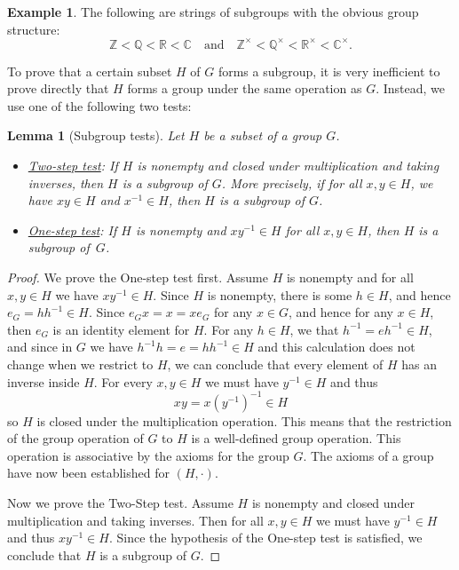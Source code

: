 \documentclass[12pt]{report}
\newtheorem{lemma}[theorem]{Lemma}
\numberwithin{equation}{section}
\numberwithin{theorem}{chapter}
\theoremstyle{definition}
\newtheorem{example}[theorem]{Example}
\newtheorem*{basic properties}{Basic Properties}
\newtheorem*{Important Remark}{Important Remark}
\newcommand{\C}{\mathbb{C}}
\begin{document}
\begin{example}
The following are strings of subgroups with the obvious group structure: 
$$\mathbb{Z} < \mathbb{Q} < \mathbb{R} < \C \quad \textrm{and} \quad \mathbb{Z}^\times < \mathbb{Q}^\times < \mathbb{R}^\times < \C^\times.$$
\end{example}


To prove that a certain subset $H$ of $G$ forms a subgroup, it is very inefficient to prove directly that $H$ forms a group under the same operation as $G$. Instead, we use one of the following two tests:

\begin{lemma}[Subgroup tests]
Let $H$ be a subset of a group $G$.
\begin{itemize}[leftmargin=10pt]
	\item \underline{Two-step test}:
If $H$ is nonempty and closed under multiplication and taking inverses, then $H$ is a subgroup of $G$. More precisely, if for all $x, y \in H$, we have $xy \in H$ and $x^{-1} \in H$, then $H$ is a subgroup of $G$.
\item \underline{One-step test}:
If $H$ is nonempty and $xy^{-1} \in H$ for all $x,y \in H$, then $H$ is a subgroup of~$G$.
\end{itemize}
\end{lemma}

\begin{proof} 
We prove the One-step test first.
Assume $H$ is nonempty and for all $x,y \in H$ we have $xy^{-1} \in H$. Since $H$ is nonempty, there is some $h \in H$, and hence $e_G = hh^{-1} \in H$. Since $e_Gx=x=xe_G$ for any $x\in G$, and hence for any $x \in H$, then $e_G$ is an identity element for $H$. For any $h \in H$, we that $h^{-1} = eh^{-1} \in H$, and since in $G$ we have $h^{-1}h = e = hh^{-1} \in H$ and this calculation does not change when we restrict to $H$, we can conclude that every element of $H$ has an inverse inside $H$. For every $x,y \in H$ we must have $y^{-1} \in H$ and thus 
$$xy = x(y^{-1})^{-1} \in H$$ 
so $H$ is closed under the multiplication operation. This means that the restriction of the group operation of $G$ to $H$ is a well-defined group operation. This operation is associative by the axioms for the group $G$. The axioms of a group have now been established for $(H, \cdot)$.

Now we prove the Two-Step test.
Assume $H$ is nonempty and closed under multiplication and taking inverses. Then for all $x,y\in H$ we must have $y^{-1}\in H$ and thus $xy^{-1}\in H$. Since the hypothesis of the One-step test is satisfied, we conclude that $H$ is a subgroup of $G$.
\end{proof}
\end{document}
